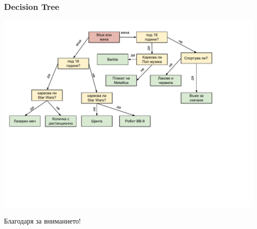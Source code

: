\documentclass{beamer}
\begin{document}
\begin{frame}[fragile]
  \frametitle{Decision Tree}
  
  \includegraphics[width=14cm]{images/tree_decision}
  
  \end{frame}
  



\begin{frame}
  \centerline{Благодаря за вниманието!}
\end{frame}
\end{document}
